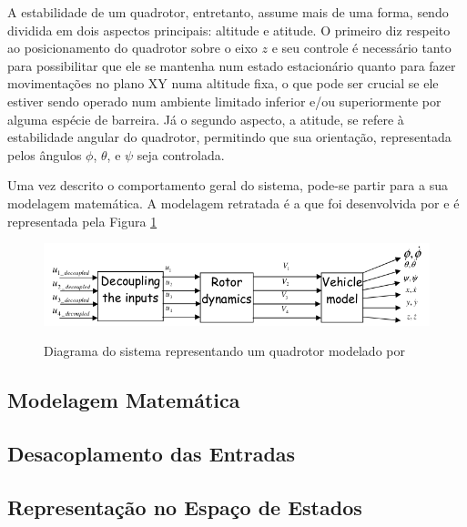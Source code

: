 A estabilidade de um quadrotor, entretanto, assume mais de uma forma, sendo dividida em dois aspectos principais: altitude e atitude. O primeiro diz respeito ao posicionamento do quadrotor sobre o eixo $z$ e seu controle é necessário tanto para possibilitar que ele se mantenha num estado estacionário quanto para fazer movimentações no plano XY numa altitude fixa, o que pode ser crucial se ele estiver sendo operado num ambiente limitado inferior e/ou superiormente por alguma espécie de barreira. Já o segundo aspecto, a atitude, se refere à estabilidade angular do quadrotor, permitindo que sua orientação, representada pelos ângulos $\phi$, $\theta$, e $\psi$ seja controlada.

Uma vez descrito o comportamento geral do sistema, pode-se partir para a sua modelagem matemática. A modelagem retratada é a que foi desenvolvida por  e é representada pela Figura \ref{fig:diagrama-quadrotor-balas}

\begin{figure}[!htb]
    \centering
    \caption{Diagrama do sistema representando um quadrotor modelado por }
    \includegraphics[width=1\textwidth]{./04-figuras/sistemas-nao-lineares/diagrama-quadrotor}
    \label{fig:diagrama-quadrotor-balas}
\end{figure}

\subsection{Modelagem Matemática}
\label{subsec:dinamica-rotores}



\subsection{Desacoplamento das Entradas}
\label{subsec:desacoplamento}



%
%


\subsection{Representação no Espaço de Estados}
\label{subsec:quadrotor-ss}


